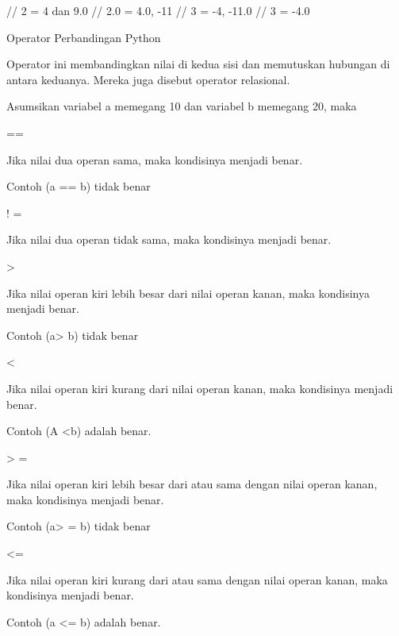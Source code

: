 \vspace{12pt}
 // 2 = 4 dan 9.0 // 2.0 = 4.0, -11 // 3 = -4, -11.0 // 3 = -4.0 \par
\vspace{12pt}
\noindent
Operator Perbandingan Python \par
\vspace{12pt}
\noindent
Operator ini membandingkan nilai di kedua sisi dan memutuskan hubungan di antara keduanya. $  $Mereka juga disebut operator relasional. \par
\vspace{12pt}
\noindent
Asumsikan variabel a memegang 10 dan variabel b memegang 20, maka  \par
\vspace{12pt}
\noindent
== \par
\noindent
Jika nilai dua operan sama, maka kondisinya menjadi benar. \par
\noindent
Contoh (a == b) tidak benar \par
\vspace{12pt}
\noindent
! = \par
\noindent
Jika nilai dua operan tidak sama, maka kondisinya menjadi benar. \par
\vspace{12pt}
\noindent
> \par
\noindent
Jika nilai operan kiri lebih besar dari nilai operan kanan, maka kondisinya menjadi benar. \par
\noindent
Contoh (a> b) tidak benar \par
\vspace{12pt}
\noindent
< \par
\noindent
Jika nilai operan kiri kurang dari nilai operan kanan, maka kondisinya menjadi benar. \par
\noindent
Contoh (A <b) adalah benar. \par
\vspace{12pt}
\noindent
> = \par
\noindent
Jika nilai operan kiri lebih besar dari atau sama dengan nilai operan kanan, maka kondisinya menjadi benar. \par
\noindent
Contoh (a> = b) tidak benar \par
\vspace{12pt}
\noindent
<= \par
\noindent
Jika nilai operan kiri kurang dari atau sama dengan nilai operan kanan, maka kondisinya menjadi benar. \par
\noindent
Contoh (a <= b) adalah benar. \par

